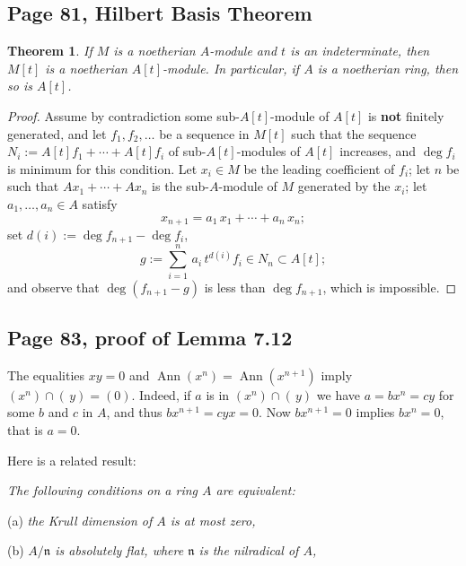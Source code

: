 \documentclass[parskip=half,fontsize=12pt]{scrartcl}%
\newcommand{\oo}{\operatorname}\newcommand{\ooo}{\operatorname*}
\newcommand{\mf}{\mathfrak}
\newtheorem{thm}{Theorem}%
\begin{document}
\subsection{Page 81, Hilbert Basis Theorem}%

\begin{thm}\label{hbt}
If $M$ is a noetherian $A$-module and $t$ is an indeterminate, then $M[t]$ is a noetherian $A[t]$-module. In particular, if $A$ is a noetherian ring, then so is $A[t]$.
\end{thm}

\begin{proof}
Assume by contradiction some sub-$A[t]$-module of $A[t]$ is \textbf{not} finitely generated, and let $f_1,f_2,\dots$ be a sequence in $M[t]$ such that the sequence $N_i:=A[t]f_1+\cdots+A[t]f_i$ of sub-$A[t]$-modules of $A[t]$ increases, and $\deg f_i$ is minimum for this condition. Let $x_i\in M$ be the leading coefficient of $f_i$; let $n$ be such that $Ax_1+\cdots+Ax_n$ is the sub-$A$-module of $M$ generated by the $x_i$; let $a_1,\dots,a_n\in A$ satisfy 
$$
x_{n+1}=a_1\,x_1+\cdots+a_n\,x_n;
$$ 
set $d(i):=\deg f_{n+1}-\deg f_i$, 
$$
g:=\sum_{i=1}^n\,a_i\,t^{d(i)}f_i\in N_n\subset A[t];
$$ 
and observe that $\deg(f_{n+1}-g)$ is less than $\deg f_{n+1}$, which is impossible.
\end{proof}

\subsection{Page 83, proof of Lemma 7.12}%

The equalities $xy=0$ and $\oo{Ann}(x^n)=\oo{Ann}(x^{n+1})$ imply $(x^n)\cap(\,y)=(0)$. Indeed, if $a$ is in $(x^n)\cap(\,y)$ we have $a=bx^n=cy$ for some $b$ and $c$ in $A$, and thus $bx^{n+1}=cyx=0$. Now $bx^{n+1}=0$ implies $bx^n=0$, that is $a=0$. 


Here is a related result:

\emph{The following conditions on a ring $A$ are equivalent:}

(a) \emph{the Krull dimension of $A$ is at most zero,}

(b) \emph{$A/\mf n$ is absolutely flat, where $\mf n$ is the nilradical of $A$,}
\end{document}

